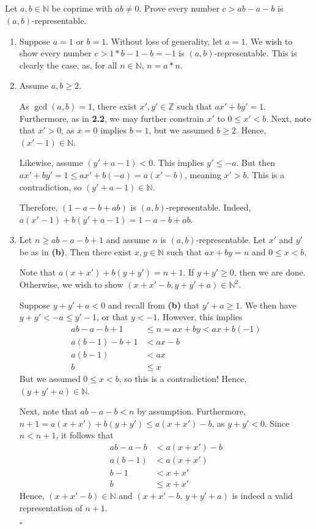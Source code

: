 \documentclass{article}
\newcommand{\N}{\mathbb{N}}
\newcommand{\Z}{\mathbb{Z}}
\begin{document}
\subsection{} %
  Let $a,b\in\N$ be coprime with $ab\ne0$. Prove every number $c>ab-a-b$ is
  $(a,b)$-representable.
  \begin{enumerate}[label=\textbf{(\alph*)}]
    \item{
      Suppose $a=1$ or $b=1$. Without loss of generality, let $a=1$. We wish to
      show every number $c>1*b-1-b=-1$ is $(a,b)$-representable. This is clearly
      the case, as, for all $n\in\N$, $n=a*n$.
    }
    \item{
      Assume $a,b\geq2$.

      As $\gcd(a,b)=1$, there exist $x',y'\in\Z$ such that
      $ax'+by'=1$. Furthermore, as in \textbf{2.2}, we may further constrain
      $x'$ to $0\leq x'<b$. Next, note that $x'>0$, as $x=0$ implies $b=1$, but
      we assumed $b\geq2$. Hence, $(x'-1)\in\N$.

      Likewise, assume $(y'+a-1)<0$. This implies $y'\leq -a$. But then $ax'+by'
      =1\leq ax'+b(-a)=a(x'-b)$, meaning $x'>b$. This is a contradiction, so
      $(y'+a-1)\in\N$.

      Therefore, $(1-a-b+ab)$ is $(a,b)$-representable. Indeed, $a(x'-1)+b(y'+a-
      1)=1-a-b+ab$.
    }
    \item{
      Let $n\geq ab-a-b+1$ and assume $n$ is $(a,b)$-representable. Let $x'$
      and $y'$ be as in \textbf{(b)}. Then there exist $x,y\in\N$ such that $ax+
      by=n$ and $0\leq x<b$.

      Note that $a(x+x')+b(y+y')=n+1$. If $y+y'\geq0$, then we are done.
      Otherwise, we wish to show $(x+x'-b,y+y'+a)\in\N^2$.

      Suppose $y+y'+a<0$ and recall from \textbf{(b)} that $y'+a\geq1$. We then
      have $y+y'<-a\leq y'-1$, or that $y<-1$. However, this implies
      \begin{align*}
          ab-a-b+1   &\leq n = ax+by < ax+b(-1)\\
          a(b-1)-b+1 &< ax-b\\
          a(b-1)     &< ax\\
          b          &\leq x
      \end{align*}
      But we assumed $0\leq x<b$, so this is a contradiction! Hence, $(y+y'+a)
      \in\N$.

      Next, note that $ab-a-b<n$ by assumption. Furthermore, $n+1=a(x+x')+b(y+
      y')\leq a(x+x')-b$, as $y+y'<0$. Since $n<n+1$, it follows that
      \begin{align*}
        ab-a-b   &< a(x+x')-b\\
        a(b-1)   &< a(x+x')\\
        b-1      &< x+x'\\
        b        &\leq x+x'
      \end{align*}
      Hence, $(x+x'-b)\in\N$ and $(x+x'-b,\,y+y'+a)$ is indeed a valid
      representation of $n+1$.
    }
    \hfill $\square$
  \end{enumerate}

\subsection{} %
\subsection{} %
\end{document}
